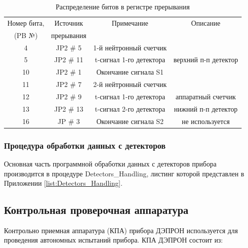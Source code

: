\begin{table} 
	\begin{tabular}{|c|c|c|c|}
		\hline
		Номер бита, &  Источник  &       Примечание        &       Описание       \\
		  (PB №)    & прерывания &                         &  \\ \hline
		     4      &  JP2 \# 5  & 1-й нейтронный счетчик  &  \\ \hline
		     5      & JP2 \# 11  & t-сигнал 1-го детектора & верхний п-п детектор \\ \hline
		    10      &  JP2 \# 1  &  Окончание сигнала S1   &  \\ \hline
		    11      &  JP2 \# 7  & 2-й нейтронный счетчик  &  \\ \hline
		    12      &  JP2 \# 9  & t-сигнал 1-го детектора &  аппаратный счетчик  \\ \hline
		    13      & JP2 \# 13  & t-сигнал 2-го детектора & нижний п-п детектор  \\ \hline
		    16      &  JP \# 3   &  Окончание сигнала S2   &   не используется    \\ \hline
	\end{tabular} 
	\caption{Распределение битов в регистре прерывания}
	\label{tab:int}
\end{table}




\subsubsection{Процедура обработки данных с детекторов}

Основная часть программной обработки данных с детекторов прибора производится в процедуре Detectors\_Handling, листинг которой представлен в Приложении \ref{list:Detectors_Handling}.




\subsection{Контрольная проверочная аппаратура}

Контрольно приемная аппаратура (КПА) прибора ДЭПРОН используется для  проведения автономных испытаний прибора. КПА ДЭПРОН состоит из:



